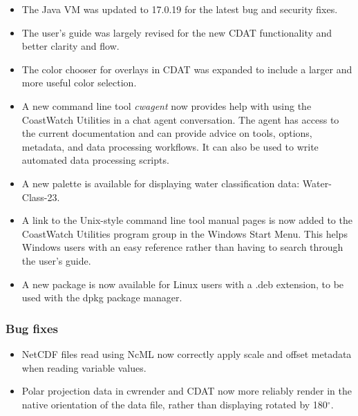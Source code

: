 \begin{itemize}

\item The Java VM was updated to 17.0.19 for the latest bug and security fixes.

\item The user's guide was largely revised for the new CDAT functionality and 
better clarity and flow.

\item The color chooser for overlays in CDAT was expanded to include a larger 
and more useful color selection.

\item A new command line tool {\em cwagent} now provides help with using the
CoastWatch Utilities in a chat agent conversation.  The agent has access to 
the current documentation and can provide advice on tools, options, metadata,
and data processing workflows.  It can also be used to write automated data
processing scripts.

\item A new palette is available for displaying water classification 
data: Water-Class-23.

\item A link to the Unix-style command line tool manual pages is now added 
to the CoastWatch Utilities program group in the Windows Start Menu.  This 
helps Windows users with an easy reference rather than having to search
through the user's guide.

\item A new package is now available for Linux users with a .deb extension,
to be used with the dpkg package manager. 

\end{itemize}

\subsubsection*{ Bug fixes}
\begin{itemize}

\item NetCDF files read using NcML now correctly apply scale and 
offset metadata when reading variable values.

\item Polar projection data in cwrender and CDAT now more reliably render in 
the native orientation of the data file, rather than displaying rotated by 
180$^{\circ}$.

\end{itemize}


